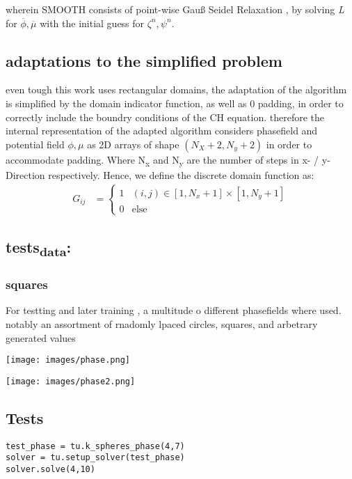 \documentclass[11pt]{article}
\begin{document}
wherein SMOOTH consists of point-wise Gauß Seidel Relaxation , by solving \emph{L} for \(\overline{\phi} ,\overline{\mu}\) with the initial guess for \(\zeta^n , \psi^n\).
\subsection{adaptations to the simplified problem}
\label{sec:org023801b}
even tough this work uses rectangular domains, the adaptation of the algorithm is simplified by the domain indicator function, as well as 0 padding, in order to correctly include the boundry conditions of the CH equation.
therefore the internal representation of the adapted algorithm considers phasefield and potential field \(\phi , \mu\) as 2D arrays of shape \((N_X + 2 , N_y + 2)\) in order to accommodate padding. Where N\textsubscript{x} and N\textsubscript{y} are the number of steps in x- / y-Direction respectively.
Hence, we define the discrete domain function as:
\begin{align*}
G_{ij} &=
\begin{cases}
1 & (i,j) \in  [1,N_x+1] \times  [1,N_y+1] \\
0 & \text{else}
\end{cases}
\end{align*}
\subsection{tests\textsubscript{data}:}
\label{sec:orge42f2e3}
\subsubsection{squares}
\label{sec:org2a7c468}
For testting and later training , a multitude o different phasefields where used. notably an assortment of rnadomly lpaced circles, squares, and arbetrary generated values
\begin{center}
\texttt{[image: images/phase.png]}
\end{center}



\begin{center}
\texttt{[image: images/phase2.png]}
\end{center}
\subsection{Tests}
\label{sec:org7dc5850}

\begin{verbatim}
test_phase = tu.k_spheres_phase(4,7)
solver = tu.setup_solver(test_phase)
solver.solve(4,10)
\end{verbatim}
\end{document}
